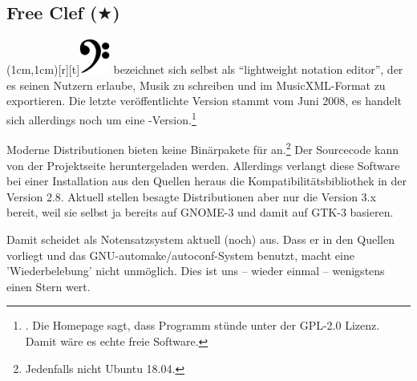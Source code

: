%
%
%

\subsection{Free Clef ($\bigstar$)}

\parpic(1cm,1cm)[r][t]{\includegraphics[width=1cm]{logos/freeclef-700dpi.png}}
\label{FreeClef} bezeichnet sich selbst als \enquote{lightweight
notation editor}, der es seinen Nutzern erlaube, Musik zu schreiben und im
MusicXML-Format zu exportieren. Die letzte veröffentlichte Version stammt vom
Juni 2008, es handelt sich allerdings noch um eine
-Version.\footnote{\cite[vgl.][\nopage wp.]{FreeClef2008a}. Die Homepage
sagt, dass Programm stünde unter der GPL-2.0 Lizenz. Damit wäre es echte freie
Software.}

Moderne Distributionen bieten keine Binärpakete für 
an.\footnote{Jedenfalls nicht Ubuntu 18.04.} Der Sourcecode kann von der
Projektseite heruntergeladen werden. Allerdings verlangt diese Software bei
einer Installation aus den Quellen heraus die Kompatibilitätsbibliothek
 in der Version 2.8. Aktuell stellen besagte Distributionen aber
nur die Version 3.x bereit, weil sie selbst ja bereits auf GNOME-3 und damit auf
GTK-3 basieren.

Damit scheidet  als Notensatzsystem aktuell (noch) aus. Dass er
in den Quellen vorliegt und das GNU-automake/autoconf-System benutzt, macht eine
'Wiederbelebung' nicht unmöglich. Dies ist uns -- wieder einmal -- wenigstens
einen Stern wert.



%
